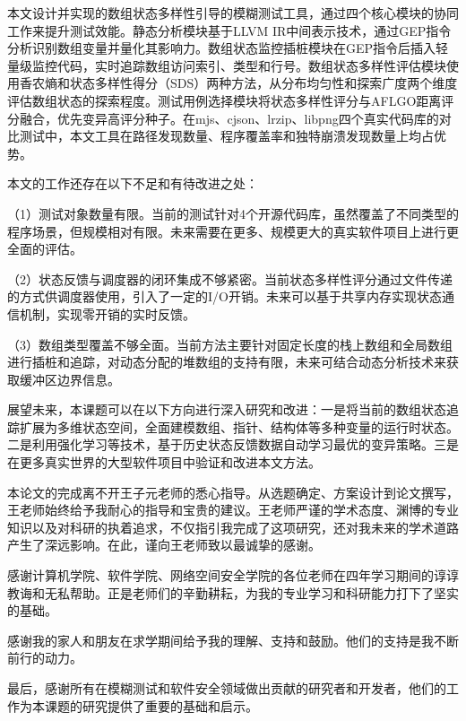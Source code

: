 \documentclass[bachelor]{njupthesis}
\begin{document}
本文设计并实现的数组状态多样性引导的模糊测试工具，通过四个核心模块的协同工作来提升测试效能。静态分析模块基于LLVM IR中间表示技术，通过GEP指令分析识别数组变量并量化其影响力。数组状态监控插桩模块在GEP指令后插入轻量级监控代码，实时追踪数组访问索引、类型和行号。数组状态多样性评估模块使用香农熵和状态多样性得分（SDS）两种方法，从分布均匀性和探索广度两个维度评估数组状态的探索程度。测试用例选择模块将状态多样性评分与AFLGO距离评分融合，优先变异高评分种子。在mjs、cjson、lrzip、libpng四个真实代码库的对比测试中，本文工具在路径发现数量、程序覆盖率和独特崩溃发现数量上均占优势。

本文的工作还存在以下不足和有待改进之处：

（1）测试对象数量有限。当前的测试针对4个开源代码库，虽然覆盖了不同类型的程序场景，但规模相对有限。未来需要在更多、规模更大的真实软件项目上进行更全面的评估。

（2）状态反馈与调度器的闭环集成不够紧密。当前状态多样性评分通过文件传递的方式供调度器使用，引入了一定的I/O开销。未来可以基于共享内存实现状态通信机制，实现零开销的实时反馈。

（3）数组类型覆盖不够全面。当前方法主要针对固定长度的栈上数组和全局数组进行插桩和追踪，对动态分配的堆数组的支持有限，未来可结合动态分析技术来获取缓冲区边界信息。

展望未来，本课题可以在以下方向进行深入研究和改进：一是将当前的数组状态追踪扩展为多维状态空间，全面建模数组、指针、结构体等多种变量的运行时状态。二是利用强化学习等技术，基于历史状态反馈数据自动学习最优的变异策略。三是在更多真实世界的大型软件项目中验证和改进本文方法。


\thesisacknowledgement
本论文的完成离不开王子元老师的悉心指导。从选题确定、方案设计到论文撰写，王老师始终给予我耐心的指导和宝贵的建议。王老师严谨的学术态度、渊博的专业知识以及对科研的执着追求，不仅指引我完成了这项研究，还对我未来的学术道路产生了深远影响。在此，谨向王老师致以最诚挚的感谢。

感谢计算机学院、软件学院、网络空间安全学院的各位老师在四年学习期间的谆谆教诲和无私帮助。正是老师们的辛勤耕耘，为我的专业学习和科研能力打下了坚实的基础。

感谢我的家人和朋友在求学期间给予我的理解、支持和鼓励。他们的支持是我不断前行的动力。

最后，感谢所有在模糊测试和软件安全领域做出贡献的研究者和开发者，他们的工作为本课题的研究提供了重要的基础和启示。

\thesisreference
\end{document}
